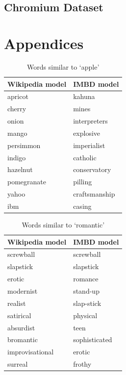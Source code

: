 \documentclass[11pt]{article}
\begin{document}
  \subsection*{Chromium Dataset}

\newpage

\printbibliography

\section*{Appendices}

  \begin{table}[h]
    \begin{center}
      \begin{tabular}{l l}
        Wikipedia model & IMBD model\\
        \hline
        apricot & kahuna\\
        cherry & mines\\
        onion & interpreters\\
        mango & explosive\\
        persimmon & imperialist\\
        indigo & catholic\\
        hazelnut & conservatory\\
        pomegranate & pilling\\
        yahoo & craftsmanship\\
        ibm & casing\\
      \end{tabular}
    \caption{Words similar to `apple'}
    \label{tab:apple}
    \end{center}
  \end{table}

  \begin{table}[h]
    \begin{center}
      \begin{tabular}{l l}
        Wikipedia model & IMBD model\\
        \hline
        screwball & screwball\\
        slapstick & slapstick\\
        erotic & romance\\
        modernist & stand-up\\
        realist & slap-stick\\
        satirical & physical\\
        absurdist & teen\\
        bromantic & sophisticated\\
        improvisational & erotic\\
        surreal & frothy\\
      \end{tabular}
    \caption{Words similar to `romantic'}
    \label{tab:romantic}
    \end{center}
  \end{table}
\end{document}
